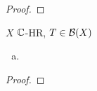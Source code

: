 	\begin{proof}
		\todor	
	\end{proof}

	\begin{bem}
	  $X$ $\mathbb{C}$-HR, $T\in\BS[X]$	
			\begin{enumerate}[a)]
				\item  \todor[Bemerkung]
			\end{enumerate}
	\end{bem}
	
	\begin{proof}
		\todor	
	\end{proof}
